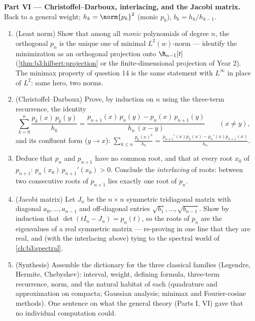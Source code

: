 \begin{problem}
\medskip
\noindent\textbf{Part VI --- Christoffel--Darboux,
interlacing, and the Jacobi matrix.} Back to a general weight;
$h_k = \norm{p_k}^2$ (monic $p_k$), $b_k = h_k/h_{k-1}$.
\begin{enumerate}[resume]
  \item (Least norm) Show that among all \emph{monic}
        polynomials of degree $n$, the orthogonal $p_n$ is
        the unique one of minimal $L^2(w)$-norm --- identify
        the minimization as an orthogonal projection onto
        $\R_{n-1}[t]$ (\cref{thm:b3:hilbert:projection} or
        the finite-dimensional projection of Year 2). The
        minimax property of question 14 is the same statement
        with $L^\infty$ in place of $L^2$: same hero, two
        norms.
  \item (Christoffel--Darboux) Prove, by induction on $n$
        using the three-term recurrence, the identity
        \[
        \sum_{k=0}^{n}\frac{p_k(x)\,p_k(y)}{h_k}
        = \frac{p_{n+1}(x)\,p_n(y) -
        p_n(x)\,p_{n+1}(y)}{h_n\,(x - y)}
        \qquad (x \neq y),
        \]
        and its confluent form ($y \to x$):
        $\sum_{k\leq n}\frac{p_k(x)^2}{h_k} =
        \frac{p_{n+1}'(x)p_n(x) - p_n'(x)p_{n+1}(x)}{h_n}$.
  \item Deduce that $p_n$ and $p_{n+1}$ have no common root,
        and that at every root $x_0$ of $p_{n+1}$:
        $p_n(x_0)\,p_{n+1}'(x_0) > 0$. Conclude the
        \emph{interlacing} of roots: between two consecutive
        roots of $p_{n+1}$ lies exactly one root of $p_n$.
  \item (Jacobi matrix) Let $J_n$ be the $n\times n$
        symmetric tridiagonal matrix with diagonal $a_0,
        \dots, a_{n-1}$ and off-diagonal entries $\sqrt{b_1},
        \dots, \sqrt{b_{n-1}}$. Show by induction that
        $\det(tI_n - J_n) = p_n(t)$, so the roots of $p_n$
        are the eigenvalues of a real symmetric matrix ---
        re-proving in one line that they are real, and (with
        the interlacing above) tying 
        to the spectral world of \cref{ch:b3:spectral}.
  \item (Synthesis) Assemble the dictionary for the three
        classical families (Legendre, Hermite, Chebyshev):
        interval, weight, defining formula, three-term
        recurrence, norm, and the natural habitat of each
        (quadrature and approximation on compacta; Gaussian
        analysis; minimax and Fourier-cosine methods). One
        sentence on what the general theory (Parts I, VI)
        gave that no individual computation could.
\end{enumerate}


\end{problem}
